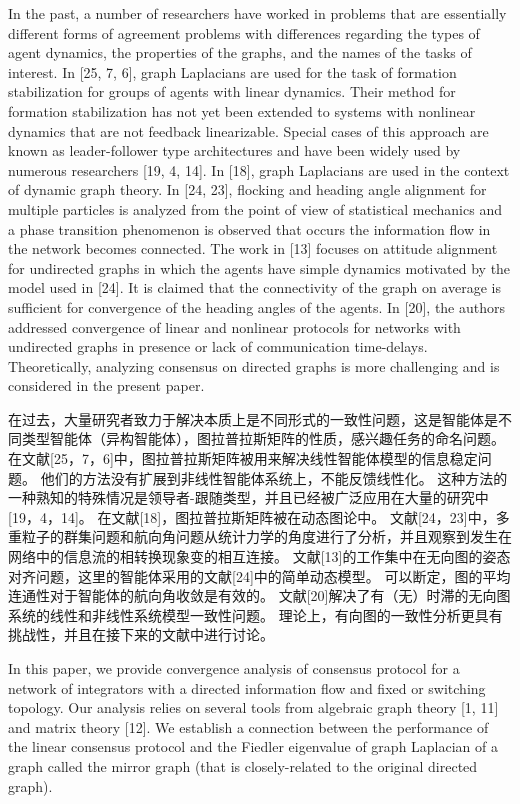 \documentclass{article}
\begin{document}
{\color[gray]{0.5}
In the past, a number of researchers have worked in problems that are essentially diﬀerent forms of agreement problems with diﬀerences regarding the types of agent dynamics, the properties of the graphs, and the names of the tasks of interest. 
In [25, 7, 6], graph Laplacians are used for the task of formation stabilization for groups of agents with linear dynamics. 
Their method for formation stabilization has not yet been extended to systems with nonlinear dynamics that are not feedback linearizable. 
Special cases of this approach are known as leader-follower type architectures and have been widely used by numerous researchers [19, 4, 14]. 
In [18], graph Laplacians are used in the context of dynamic graph theory. 
In [24, 23], ﬂocking and heading angle alignment for multiple particles is analyzed from the point of view of statistical mechanics and a phase transition phenomenon is observed that occurs the information ﬂow in the network becomes connected. 
The work in [13] focuses on attitude alignment for undirected graphs in which the agents have simple dynamics motivated by the model used in [24]. 
It is claimed that the connectivity of the graph on average is suﬃcient for convergence of the heading angles of the agents. 
In [20], the authors addressed convergence of linear and nonlinear protocols for networks with undirected graphs in presence or lack of communication time-delays. 
Theoretically, analyzing consensus on directed graphs is more challenging and is considered in the present paper.
}

在过去，大量研究者致力于解决本质上是不同形式的一致性问题，这是智能体是不同类型智能体（异构智能体），图拉普拉斯矩阵的性质，感兴趣任务的命名问题。
在文献[25，7，6]中，图拉普拉斯矩阵被用来解决线性智能体模型的信息稳定问题。
他们的方法没有扩展到非线性智能体系统上，不能反馈线性化。
这种方法的一种熟知的特殊情况是领导者-跟随类型，并且已经被广泛应用在大量的研究中[19，4，14]。
在文献[18]，图拉普拉斯矩阵被在动态图论中。
文献[24，23]中，多重粒子的群集问题和航向角问题从统计力学的角度进行了分析，并且观察到发生在网络中的信息流的相转换现象变的相互连接。
文献[13]的工作集中在无向图的姿态对齐问题，这里的智能体采用的文献[24]中的简单动态模型。
可以断定，图的平均连通性对于智能体的航向角收敛是有效的。
文献[20]解决了有（无）时滞的无向图系统的线性和非线性系统模型一致性问题。
理论上，有向图的一致性分析更具有挑战性，并且在接下来的文献中进行讨论。

{\color[gray]{0.5}
In this paper, we provide convergence analysis of consensus protocol for a network of integrators with a directed information ﬂow and ﬁxed or switching topology. 
Our analysis relies on several tools from algebraic graph theory [1, 11] and matrix theory [12]. 
We establish a connection between the performance of the linear consensus protocol and the Fiedler eigenvalue of graph Laplacian of a graph called the mirror graph (that is closely-related to the original directed graph).
}
\end{document}
